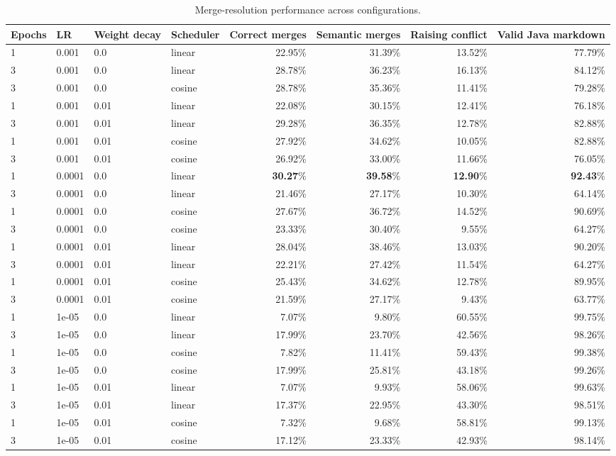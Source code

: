 \begin{table}[ht]
\centering
\begin{tabular}{l l l l r r r r}
\toprule
Epochs & LR & Weight decay & Scheduler & Correct merges & Semantic merges & Raising conflict & Valid Java markdown \\
\midrule
1 & 0.001 & 0.0 & linear & 22.95\% & 31.39\% & 13.52\% & 77.79\% \\
3 & 0.001 & 0.0 & linear & 28.78\% & 36.23\% & 16.13\% & 84.12\% \\
3 & 0.001 & 0.0 & cosine & 28.78\% & 35.36\% & 11.41\% & 79.28\% \\
1 & 0.001 & 0.01 & linear & 22.08\% & 30.15\% & 12.41\% & 76.18\% \\
3 & 0.001 & 0.01 & linear & 29.28\% & 36.35\% & 12.78\% & 82.88\% \\
1 & 0.001 & 0.01 & cosine & 27.92\% & 34.62\% & 10.05\% & 82.88\% \\
3 & 0.001 & 0.01 & cosine & 26.92\% & 33.00\% & 11.66\% & 76.05\% \\
1 & 0.0001 & 0.0 & linear & \textbf{30.27}\% & \textbf{39.58}\% & \textbf{12.90}\% & \textbf{92.43}\% \\
3 & 0.0001 & 0.0 & linear & 21.46\% & 27.17\% & 10.30\% & 64.14\% \\
1 & 0.0001 & 0.0 & cosine & 27.67\% & 36.72\% & 14.52\% & 90.69\% \\
3 & 0.0001 & 0.0 & cosine & 23.33\% & 30.40\% & 9.55\% & 64.27\% \\
1 & 0.0001 & 0.01 & linear & 28.04\% & 38.46\% & 13.03\% & 90.20\% \\
3 & 0.0001 & 0.01 & linear & 22.21\% & 27.42\% & 11.54\% & 64.27\% \\
1 & 0.0001 & 0.01 & cosine & 25.43\% & 34.62\% & 12.78\% & 89.95\% \\
3 & 0.0001 & 0.01 & cosine & 21.59\% & 27.17\% & 9.43\% & 63.77\% \\
1 & 1e-05 & 0.0 & linear & 7.07\% & 9.80\% & 60.55\% & 99.75\% \\
3 & 1e-05 & 0.0 & linear & 17.99\% & 23.70\% & 42.56\% & 98.26\% \\
1 & 1e-05 & 0.0 & cosine & 7.82\% & 11.41\% & 59.43\% & 99.38\% \\
3 & 1e-05 & 0.0 & cosine & 17.99\% & 25.81\% & 43.18\% & 99.26\% \\
1 & 1e-05 & 0.01 & linear & 7.07\% & 9.93\% & 58.06\% & 99.63\% \\
3 & 1e-05 & 0.01 & linear & 17.37\% & 22.95\% & 43.30\% & 98.51\% \\
1 & 1e-05 & 0.01 & cosine & 7.32\% & 9.68\% & 58.81\% & 99.13\% \\
3 & 1e-05 & 0.01 & cosine & 17.12\% & 23.33\% & 42.93\% & 98.14\% \\
\bottomrule
\end{tabular}
\caption{Merge-resolution performance across configurations.}
\end{table}
